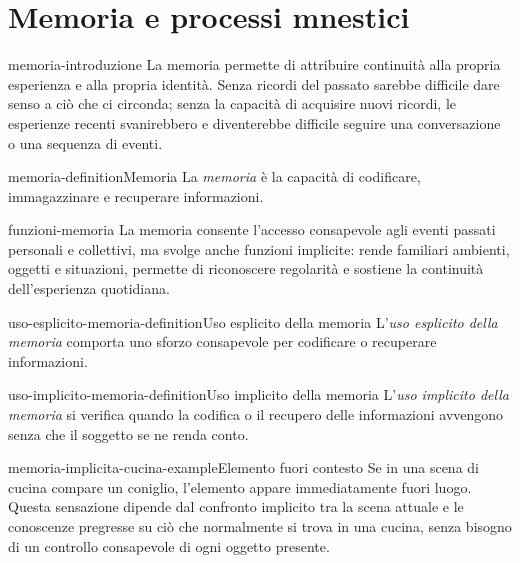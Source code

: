 \documentclass[preview]{standalone}
\begin{document}
\genpage

\section{Memoria e processi mnestici}

\begin{snippet}{memoria-introduzione}
    La memoria permette di attribuire continuità alla propria esperienza e alla
    propria identità. Senza ricordi del passato sarebbe difficile dare senso a
    ciò che ci circonda; senza la capacità di acquisire nuovi ricordi, le
    esperienze recenti svanirebbero e diventerebbe difficile seguire una
    conversazione o una sequenza di eventi.
\end{snippet}

\begin{snippetdefinition}{memoria-definition}{Memoria}
    La \emph{memoria} è la capacità di codificare, immagazzinare e recuperare
    informazioni.
\end{snippetdefinition}

\begin{snippet}{funzioni-memoria}
    La memoria consente l'accesso consapevole agli eventi passati personali e
    collettivi, ma svolge anche funzioni implicite: rende familiari ambienti,
    oggetti e situazioni, permette di riconoscere regolarità e sostiene la
    continuità dell'esperienza quotidiana.
\end{snippet}


\begin{snippetdefinition}{uso-esplicito-memoria-definition}{Uso esplicito della memoria}
    L'\emph{uso esplicito della memoria} comporta uno sforzo consapevole per
    codificare o recuperare informazioni.
\end{snippetdefinition}

\begin{snippetdefinition}{uso-implicito-memoria-definition}{Uso implicito della memoria}
    L'\emph{uso implicito della memoria} si verifica quando la codifica o il
    recupero delle informazioni avvengono senza che il soggetto se ne renda
    conto.
\end{snippetdefinition}

\begin{snippetexample}{memoria-implicita-cucina-example}{Elemento fuori contesto}
    Se in una scena di cucina compare un coniglio, l'elemento appare
    immediatamente fuori luogo. Questa sensazione dipende dal confronto implicito
    tra la scena attuale e le conoscenze pregresse su ciò che normalmente si
    trova in una cucina, senza bisogno di un controllo consapevole di ogni
    oggetto presente.
\end{snippetexample}
\end{document}
